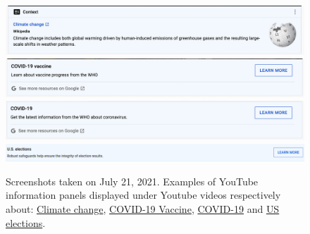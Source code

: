 \documentclass{article}
\begin{document}
\begin{figure}[h]
	\centering
		\includegraphics[scale=0.3]{./img/youtube_panels/yt_1.png} 
		\includegraphics[scale=0.29]{./img/youtube_panels/yt_2.png} 
		\includegraphics[scale=0.294]{./img/youtube_panels/yt_3.png}
		\includegraphics[scale=0.3]{./img/youtube_panels/yt_4.png} 
	\caption{Screenshots taken on July 21, 2021. Examples of YouTube information panels displayed under Youtube videos respectively about: \href{https://www.youtube.com/watch?v=OwqIy8Ikv-c}{Climate change}, \href{https://www.youtube.com/watch?v=9sW0OmzcmL0}{COVID-19 Vaccine}, \href{https://www.youtube.com/watch?v=usyQgPU-VrI}{COVID-19} and \href{https://www.youtube.com/watch?v=8PAwc8nlE\_Q}{US elections}. }
	\label{fig9}
\end{figure}
\end{document}
